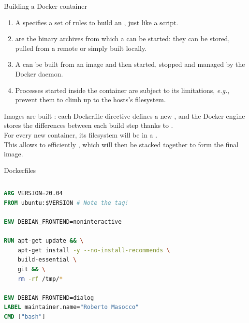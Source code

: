 \begin{frame}{Building a Docker container}
	\begin{enumerate}
		\item A  specifies a set of rules to build an , just like a script.
		\item {} are the binary archives from which a  can be started: they can be stored, pulled from a remote  or simply built locally.
		\item A  can be built from an image and then started, stopped and managed by the Docker daemon.
		\item Processes started inside the container are subject to its limitations, \emph{e.g.},  prevent them to climb up to the hosts's filesystem.
	\end{enumerate}
	Images are built : each Dockerfile directive defines a new , and the Docker engine stores the differences between each build step thanks to .\\
  For every new container, its filesystem will be in a .\\
  This allows to efficiently , which will then be stacked together to form the final image.
\end{frame}

\begin{frame}[fragile]{Dockerfiles}
	\begin{columns}
		\begin{lstlisting}[language=Dockerfile, caption=Minimal example of a Dockerfile running an Ubuntu image in a container]
ARG VERSION=20.04
FROM ubuntu:$VERSION # Note the tag!

ENV DEBIAN_FRONTEND=noninteractive

RUN apt-get update && \
    apt-get install -y --no-install-recommends \
    build-essential \
    git && \
    rm -rf /tmp/*

ENV DEBIAN_FRONTEND=dialog
LABEL maintainer.name="Roberto Masocco"
CMD ["bash"]
\end{lstlisting}
	\end{columns}
\end{frame}

